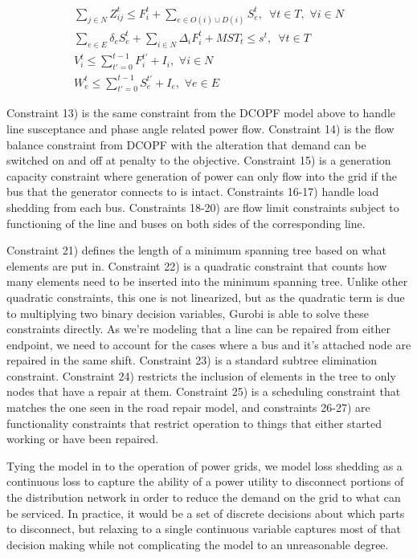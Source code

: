 \documentclass{article}
\begin{document}
\begin{eqnarray}
	\sum_{j \in N} Z_{ij}^t \leq F_i^t + \sum_{e \in O(i) \cup D(i)} S_{e}^t, \hspace{6pt} \forall t \in T, \hspace{4pt} \forall i \in N \\
	\sum_{e \in E} \delta_{e}S_e^t + \sum_{i \in N}\Delta_{i}F_i^t + MST_t \le s^t, \hspace{6pt} \forall t \in T\\
	V_i^t \leq \sum_{t'=0}^{t-1} F_i^{t'}+I_i, \hspace{4pt} \forall i \in N\\
	W_{e}^t \leq \sum_{t'=0}^{t-1} S_{e}^{t'}+I_e, \hspace{4pt} \forall e \in E
	\end{eqnarray}
	
	Constraint 13) is the same constraint from the DCOPF model above to handle line susceptance and phase angle related power flow. Constraint 14) is the flow balance constraint from DCOPF with the alteration that demand can be switched on and off at penalty to the objective. Constraint 15) is a generation capacity constraint where generation of power can only flow into the grid if the bus that the generator connects to is intact. Constraints 16-17) handle load shedding from each bus. Constraints 18-20) are flow limit constraints subject to functioning of the line and buses on both sides of the corresponding line.
	
	Constraint 21) defines the length of a minimum spanning tree based on what elements are put in. Constraint 22) is a quadratic constraint that counts how many elements need to be inserted into the minimum spanning tree. Unlike other quadratic constraints, this one is not linearized, but as the quadratic term is due to multiplying two binary decision variables, Gurobi is able to solve these constraints directly. As we're modeling that a line can be repaired from either endpoint, we need to account for the cases where a bus and it's attached node are repaired in the same shift. Constraint 23) is a standard subtree elimination constraint. Constraint 24) restricts the inclusion of elements in the tree to only nodes that have a repair at them. Constraint 25) is a scheduling constraint that matches the one seen in the road repair model, and constraints 26-27) are functionality constraints that restrict operation to things that either started working or have been repaired.
	
	Tying the model in to the operation of power grids, we model loss shedding as a continuous loss to capture the ability of a power utility to disconnect portions of the distribution network in order to reduce the demand on the grid to what can be serviced. In practice, it would be a set of discrete decisions about which parts to disconnect, but relaxing to a single continuous variable captures most of that decision making while not complicating the model to an unreasonable degree.
	
\end{document}
